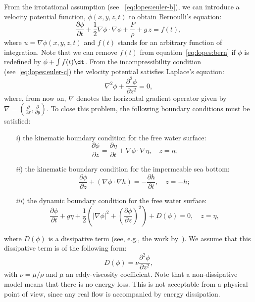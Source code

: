 From the irrotational assumption (see
~\eqref{eq:lopes:euler-b}), we can introduce a velocity
potential function, $\phi(x,y,z,t)$ to
obtain Bernoulli's equation:
\begin{equation}\label{eq:lopes:bern}
\frac{\partial \phi}{\partial t}+\frac{1}{2}\nabla \phi \cdot\nabla \phi
+\frac{P}{\rho} +g\, z=f(t),
\end{equation}
where $u=\nabla\phi(x,y,z,t)$ and $f(t)$ stands for an
arbitrary function of integration.  Note that we can remove
$f(t)$ from equation~\eqref{eq:lopes:bern} if $\phi$ is
redefined by $\phi+\int f(t) \dt$.  From the
incompressibility condition (see~\eqref{eq:lopes:euler-c})
the velocity potential satisfies Laplace's equation:
\begin{equation}\label{eq:lopes:lap}
\nabla^2\phi+\frac{\partial^2\phi}{\partial z^2}=0,
\end{equation}
where, from now on, $\nabla$ denotes the horizontal gradient
operator given by
$\nabla=\left(\frac{\partial }{\partial x},\frac{\partial
}{\partial y}\right)\!\!.$ To close
this problem, the following boundary conditions must be
satisfied:
\begin{enumerate}
\item[{\it i})] the kinematic boundary condition for the
  free water surface:
\begin{equation}
\frac{\partial \phi}{\partial
  z}=\frac{\partial\eta}{\partial t}+\nabla\phi\cdot\nabla\eta,\quad
z=\eta;
\end{equation}
\item[{\it ii})] the kinematic boundary condition for the
  impermeable sea bottom:
\begin{equation}
\frac{\partial \phi}{\partial z}+(\nabla\phi\cdot\nabla
h)=-\frac{\partial h}{\partial t}, \quad
z=-h ;
\end{equation}
\item[{\it iii})] the dynamic boundary condition for the
  free water surface:
\begin{equation}\label{eq:lopes:dyn}
\frac{\partial \phi}{\partial t}+ g\eta+\frac{1}{2} \left(|\nabla\phi|^2
+\left(\frac{\partial \phi}{\partial z}\right)^2\right)+
D(\phi)
= 0,
\quad z =\eta,
\end{equation}
\end{enumerate}
where $D(\phi)$ is a dissipative term (see, e.g., the work
by~\citet{DutykhDias2007}).  We assume that this dissipative
term is of the following form:
\begin{equation}\label{eq:lopes:diss}
 D(\phi)=\nu\frac{\partial ^2\phi}{\partial z^2},
\end{equation}
with $\nu=\bar{\mu}/\rho$ and $\bar{\mu}$ an eddy-viscosity
coefficient.  Note that a non-dissipative model means that
there is no energy loss.  This is not acceptable from a
physical point of view, since any real flow is accompanied
by energy dissipation.


